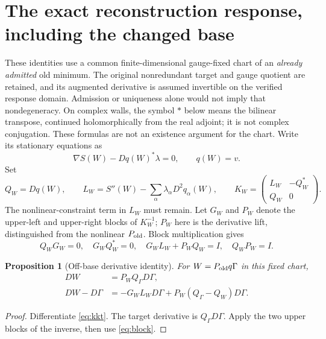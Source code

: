 \documentclass[11pt,letterpaper]{article}
\numberwithin{equation}{section}
\theoremstyle{plain}
\newtheorem{proposition}[theorem]{Proposition}
\theoremstyle{remark}\newtheorem{remark}[theorem]{Scope}
\begin{document}
\section{The exact reconstruction response, including the changed base}

These identities use a common finite-dimensional gauge-fixed chart of an
\emph{already admitted} old minimum. The original nonredundant target and
gauge quotient are retained, and its augmented derivative is assumed
invertible on the verified response domain. Admission or uniqueness alone
would not imply that nondegeneracy. On complex walls, the symbol $*$ below
means the bilinear transpose, continued holomorphically from the real
adjoint; it is not complex conjugation. These formulas are not an
existence argument for the chart. Write its stationary equations as
\begin{equation}
 \nabla S(W)-Dq(W)^*\lambda=0,\qquad q(W)=v.
 \label{eq:kkt}
\end{equation}
Set
\begin{equation}
 Q_W=Dq(W),\qquad
 L_W=S''(W)-\sum_\alpha\lambda_\alpha D^2q_\alpha(W),\qquad
 K_W=\begin{pmatrix}L_W&-Q_W^*\\Q_W&0\end{pmatrix}.
 \label{eq:lagrangian}
\end{equation}
The nonlinear-constraint term in $L_W$ must remain. Let $G_W$ and $P_W$
denote the upper-left and upper-right blocks of $K_W^{-1}$; $P_W$ here is
the derivative lift, distinguished from the nonlinear $P_{\rm old}$.
Block multiplication gives
\begin{equation}
 Q_WG_W=0,\quad G_WQ_W^*=0,\quad
 G_WL_W+P_WQ_W=I,\quad Q_WP_W=I.
 \label{eq:block}
\end{equation}

\begin{proposition}[Off-base derivative identity]
For $W=P_{\rm old}q\Gamma$ in this fixed chart,
\begin{align}
 DW&=P_WQ_\Gamma D\Gamma,\label{eq:exactresponse}\\
 DW-D\Gamma
 &=-G_WL_WD\Gamma
   +P_W(Q_\Gamma-Q_W)D\Gamma.\label{eq:offbase}
\end{align}
\end{proposition}
\begin{proof}
Differentiate \eqref{eq:kkt}. The target derivative is $Q_\Gamma D\Gamma$.
Apply the two upper blocks of the inverse, then use \eqref{eq:block}.
\end{proof}
\end{document}
